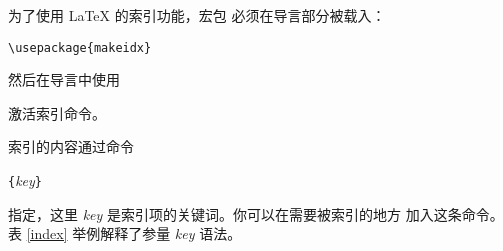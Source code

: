 为了使用 \LaTeX{} 的索引功能，宏包  必须在导言部分被载入：
\begin{lscommand}
  \verb|\usepackage{makeidx}|
\end{lscommand}
\noindent 然后在导言中使用
\begin{lscommand}
\end{lscommand}
\noindent 激活索引命令。


索引的内容通过命令
\begin{lscommand}
  \verb|{|\emph{key}\verb|}|
\end{lscommand}
\noindent
指定，这里 \emph{key} 是索引项的关键词。你可以在需要被索引的地方
加入这条命令。表 \ref{index} 举例解释了参量 \emph{key} 语法。


